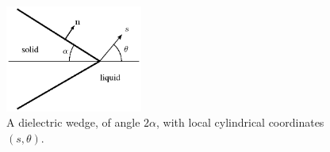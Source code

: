 \begin{figure}[h]
\begin{center}
\includegraphics[width=0.4\textwidth,clip=true]{eddies/eddy_fig3b.eps}

\end{center}

\caption{A dielectric wedge, of angle $2\alpha$, with local
cylindrical coordinates $(s,\theta)$.
\label{fig:corner}}
\end{figure}

